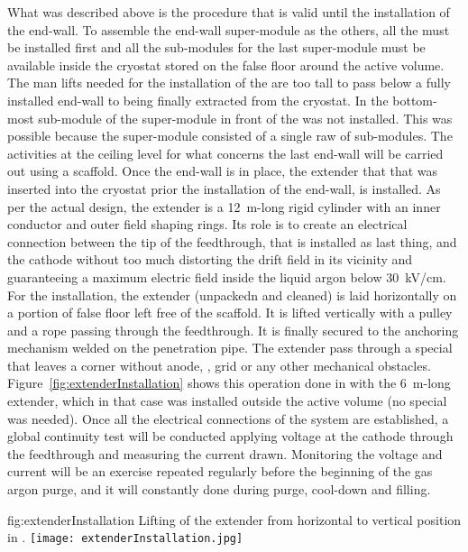 What was described above is the procedure that is valid until the installation of the  end-wall.
To assemble the end-wall super-module as the others, all the  must be installed first and all the sub-modules for the last super-module must be available inside the cryostat stored on the false floor around the active volume.
The man lifts needed for the installation of the  are too tall to pass below a fully installed end-wall to being finally extracted from the cryostat.
In  the bottom-most sub-module of the super-module in front of the  was not installed.
This was possible because the super-module consisted of a single raw of sub-modules.
The activities at the ceiling level for what concerns the last end-wall will be carried out using a scaffold.
Once the end-wall is in place, the  extender that that was inserted into the cryostat prior the installation of the end-wall,
is installed.
As per the actual design, the extender is a 12~m-long rigid cylinder with an inner conductor and outer field shaping rings.
Its role is to create an electrical connection between the tip of the feedthrough, that is installed as last thing, and the cathode without too much distorting the drift field in its vicinity and guaranteeing a maximum electric field inside the liquid argon below 30~kV/cm.
For the installation, the extender (unpackedn and cleaned) is laid horizontally on a portion of false floor left free of the scaffold.
It is lifted vertically with a pulley and a rope passing through the  feedthrough.
It is finally secured to the anchoring mechanism welded on the penetration pipe.
The extender pass through a special  that leaves a corner without anode, , grid or any other mechanical obstacles.
Figure~\ref{fig:extenderInstallation} shows this operation done in  with the 6~m-long extender, which in that case was installed outside the active volume (no special  was needed).
Once all the electrical connections of the  system are established, a global continuity test will be conducted applying voltage at the cathode through the  feedthrough and measuring the current drawn.
Monitoring the voltage and current will be an exercise repeated regularly before the beginning of the gas argon purge, and it will constantly done during purge, cool-down and filling. 
\begin{dunefigure}{fig:extenderInstallation}
{Lifting of the  extender from horizontal to vertical position in  .}
\texttt{[image: extenderInstallation.jpg]}
\end{dunefigure}



